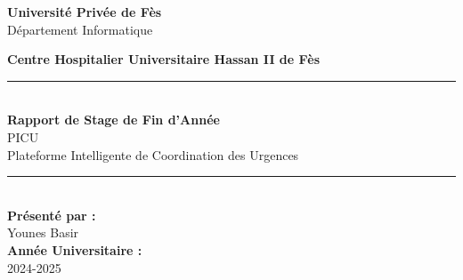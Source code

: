 \begin{titlepage}
    \centering
    \vspace*{\fill}


    {\Large\textbf{Université Privée de Fès}}\\[0.3cm]
    {\large Département Informatique}\\[0.9cm]


    {\Large\textbf{Centre Hospitalier Universitaire Hassan II de Fès}}\\[0.8cm]

    \rule{12cm}{0.4pt}\\[0.8cm]

    {\Huge\textbf{Rapport de Stage de Fin d'Année}}\\[0.5cm]
    {\Large PICU}\\[0.3cm]
    {\large Plateforme Intelligente de Coordination des Urgences}\\[0.8cm]

    \rule{12cm}{0.4pt}\\[0.8cm]

    {\Large\textbf{Présenté par :}}\\[0.3cm]
    {\Large Younes Basir}\\[0.7cm]

    {\Large\textbf{Année Universitaire :}}\\[0.3cm]
    {\Large 2024-2025}

    \vspace*{\fill}
\end{titlepage}
